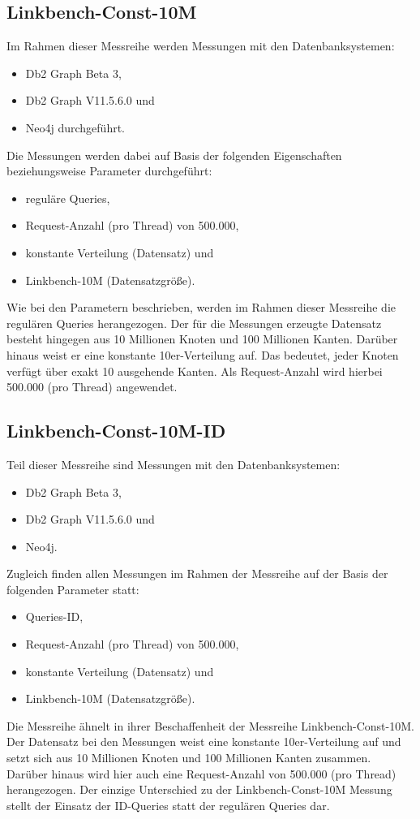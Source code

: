 \subsection{Linkbench-Const-10M}
Im Rahmen dieser Messreihe werden Messungen mit den Datenbanksystemen:
\begin{itemize}
    \item Db2 Graph Beta 3,
    \item Db2 Graph V11.5.6.0 und 
    \item Neo4j durchgeführt. 
\end{itemize}
Die Messungen werden dabei auf Basis der folgenden Eigenschaften beziehungsweise Parameter durchgeführt:
\begin{itemize}
    \item reguläre Queries,
    \item Request-Anzahl (pro Thread) von 500.000, 
    \item konstante Verteilung (Datensatz) und
    \item Linkbench-10M (Datensatzgröße).
\end{itemize}
Wie bei den Parametern beschrieben, werden im Rahmen dieser Messreihe die regulären Queries herangezogen. Der für die Messungen erzeugte Datensatz besteht hingegen aus 10 Millionen Knoten und 100 Millionen Kanten. Darüber hinaus weist er eine konstante 10er-Verteilung auf. Das bedeutet, jeder Knoten verfügt über exakt 10 ausgehende Kanten. Als Request-Anzahl wird hierbei 500.000 (pro Thread) angewendet.

\subsection{Linkbench-Const-10M-ID}
Teil dieser Messreihe sind Messungen mit den Datenbanksystemen:
\begin{itemize}
    \item Db2 Graph Beta 3,
    \item Db2 Graph V11.5.6.0 und 
    \item Neo4j. 
\end{itemize}

Zugleich finden allen Messungen im Rahmen der Messreihe auf der Basis der folgenden Parameter statt:
\begin{itemize}
    \item Queries-ID,
    \item Request-Anzahl (pro Thread) von 500.000, 
    \item konstante Verteilung (Datensatz) und
    \item Linkbench-10M (Datensatzgröße).
\end{itemize}
Die Messreihe ähnelt in ihrer Beschaffenheit der Messreihe Linkbench-Const-10M. Der Datensatz bei den Messungen weist eine konstante 10er-Verteilung auf und setzt sich aus 10 Millionen Knoten und 100 Millionen Kanten zusammen. Darüber hinaus wird hier auch eine Request-Anzahl von 500.000 (pro Thread) herangezogen. Der einzige Unterschied zu der Linkbench-Const-10M Messung stellt der Einsatz der ID-Queries statt der regulären Queries dar.

